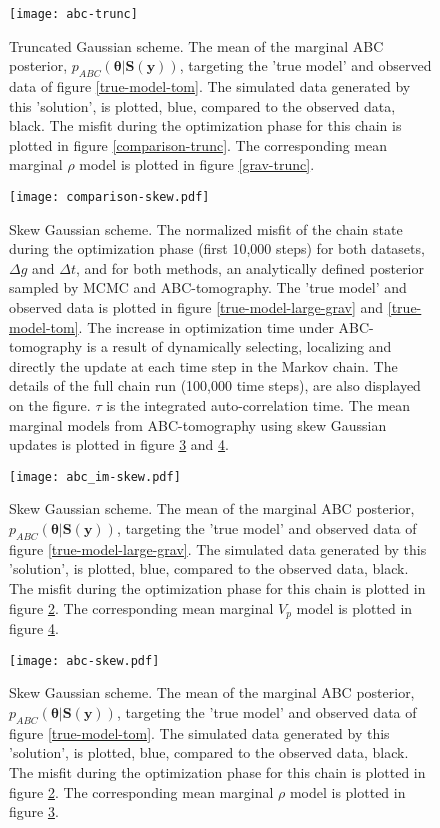 \begin{figure}
	\centering
	\texttt{[image: abc-trunc]}
	\caption{Truncated Gaussian scheme. The mean of the marginal ABC posterior, $p_{ABC}(\bm{\theta}|\bm{S}(\bm{y}))$, targeting the 'true model' and observed data of figure \ref{true-model-tom}. The simulated data generated by this 'solution', is plotted, blue, compared to the observed data, black. The misfit during the optimization phase for this chain is plotted in figure \ref{comparison-trunc}. The corresponding mean marginal $\rho$ model is plotted in figure \ref{grav-trunc}.}
	\label{tom-trunc}
\end{figure}

\begin{figure}
	\centering
	\texttt{[image: comparison-skew.pdf]}
	\caption{Skew Gaussian scheme. The normalized misfit of the chain state during the optimization phase (first 10,000 steps) for both datasets, $\Delta g$ and $\Delta t$, and for both methods, an analytically defined posterior sampled by MCMC and ABC-tomography. The 'true model' and observed data is plotted in figure \ref{true-model-large-grav} and \ref{true-model-tom}. The increase in optimization time under ABC-tomography is a result of dynamically selecting, localizing and directly the update at each time step in the Markov chain. The details of the full chain run (100,000 time steps), are also displayed on the figure. $\tau$ is the integrated auto-correlation time. The mean marginal models from ABC-tomography using skew Gaussian updates is plotted in figure \ref{grav-skew} and \ref{tom-skew}.}
	\label{comparison-skew}
\end{figure}

\begin{figure}
	\centering
	\texttt{[image: abc\_im-skew.pdf]}
	\caption{Skew Gaussian scheme. The mean of the marginal ABC posterior, $p_{ABC}(\bm{\theta}|\bm{S}(\bm{y}))$, targeting the 'true model' and observed data of figure \ref{true-model-large-grav}. The simulated data generated by this 'solution', is plotted, blue, compared to the observed data, black. The misfit during the optimization phase for this chain is plotted in figure \ref{comparison-skew}. The corresponding mean marginal $V_p$ model is plotted in figure \ref{tom-skew}.}
	\label{grav-skew}
\end{figure}

\begin{figure}
	\centering
	\texttt{[image: abc-skew.pdf]}
		\caption{Skew Gaussian scheme. The mean of the marginal ABC posterior, $p_{ABC}(\bm{\theta}|\bm{S}(\bm{y}))$, targeting the 'true model' and observed data of figure \ref{true-model-tom}. The simulated data generated by this 'solution', is plotted, blue, compared to the observed data, black. The misfit during the optimization phase for this chain is plotted in figure \ref{comparison-skew}. The corresponding mean marginal $\rho$ model is plotted in figure \ref{grav-skew}.}
	\label{tom-skew}
\end{figure}


